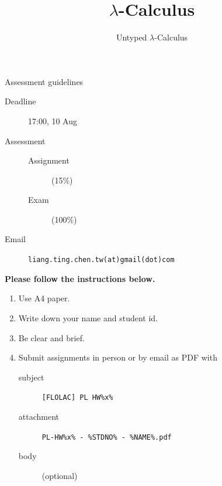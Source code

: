 \title{$\lambda$-Calculus}
\subtitle{Untyped $\lambda$-Calculus}


{
\begin{frame}\maketitle\end{frame}}

\begin{frame}[fragile]{Assessment guidelines}
  \begin{description}
    \item[Deadline] 17:00, 10 Aug
    \item[Assessment] 
      \begin{description}
        \item[Assignment] (15\%)
        \item[Exam] (100\%)
      \end{description}
    \item[Email] \texttt{liang.ting.chen.tw(at)gmail(dot)com}
  \end{description}

  \textbf{Please follow the instructions below.}

  \begin{enumerate}
    \item Use A4 paper.
    \item Write down your name and student id. 
    \item Be clear and brief.
    \item Submit assignments in person or by email as \alert{PDF} with 
      \begin{description}
        \item[subject] \texttt{[FLOLAC] PL HW\%x\%}
        \item[attachment] \texttt{PL-HW\%x\% - \%STDNO\% - \%NAME\%.pdf}
        \item[body] (optional)
      \end{description}
  \end{enumerate}
\end{frame}

